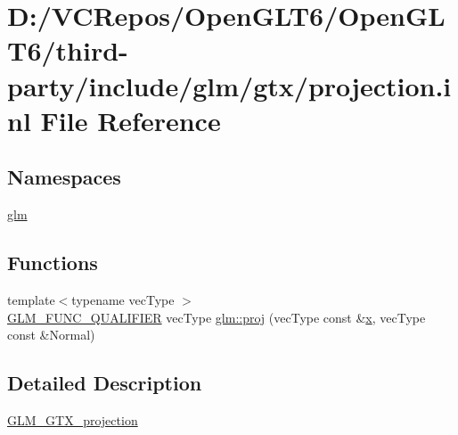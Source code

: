 \hypertarget{projection_8inl}{}\section{D\+:/\+V\+C\+Repos/\+Open\+G\+L\+T6/\+Open\+G\+L\+T6/third-\/party/include/glm/gtx/projection.inl File Reference}
\label{projection_8inl}
\subsection*{Namespaces}
\begin{DoxyCompactItemize}
\item 
 \mbox{\hyperlink{namespaceglm}{glm}}
\end{DoxyCompactItemize}
\subsection*{Functions}
\begin{DoxyCompactItemize}
\item 
{\footnotesize template$<$typename vec\+Type $>$ }\\\mbox{\hyperlink{setup_8hpp_a33fdea6f91c5f834105f7415e2a64407}{G\+L\+M\+\_\+\+F\+U\+N\+C\+\_\+\+Q\+U\+A\+L\+I\+F\+I\+ER}} vec\+Type \mbox{\hyperlink{group__gtx__projection_gadf29123bcf748fc9d6fb0998192184cf}{glm\+::proj}} (vec\+Type const \&\mbox{\hyperlink{glad_8h_a92d0386e5c19fb81ea88c9f99644ab1d}{x}}, vec\+Type const \&Normal)
\end{DoxyCompactItemize}


\subsection{Detailed Description}
\mbox{\hyperlink{group__gtx__projection}{G\+L\+M\+\_\+\+G\+T\+X\+\_\+projection}} 